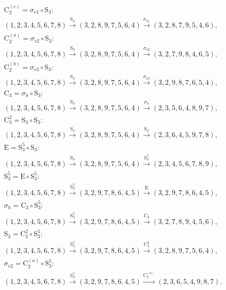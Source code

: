\begin{align*}
& \mathrm{C}_{2}^{(c)} = \sigma_{v1} \circ \mathrm{S}_{3}:\; \\& (1,2,3,4,5,6,7,8) \xrightarrow{\mathrm{S}_{3}} (3,2,8,9,7,5,6,4) \xrightarrow{\sigma_{v1}} (3,2,8,7,9,5,4,6), \\
& \mathrm{C}_{2}^{(a)} = \sigma_{v2} \circ \mathrm{S}_{3}:\; \\& (1,2,3,4,5,6,7,8) \xrightarrow{\mathrm{S}_{3}} (3,2,8,9,7,5,6,4) \xrightarrow{\sigma_{v2}} (3,2,7,9,8,4,6,5), \\
& \mathrm{C}_{2}^{(b)} = \sigma_{v3} \circ \mathrm{S}_{3}:\; \\& (1,2,3,4,5,6,7,8) \xrightarrow{\mathrm{S}_{3}} (3,2,8,9,7,5,6,4) \xrightarrow{\sigma_{v3}} (3,2,9,8,7,6,5,4), \\
& \mathrm{C}_{3} = \sigma_{h} \circ \mathrm{S}_{3}:\; \\& (1,2,3,4,5,6,7,8) \xrightarrow{\mathrm{S}_{3}} (3,2,8,9,7,5,6,4) \xrightarrow{\sigma_{h}} (2,3,5,6,4,8,9,7), \\
& \mathrm{C}_{3}^{2} = \mathrm{S}_{3} \circ \mathrm{S}_{3}:\; \\& (1,2,3,4,5,6,7,8) \xrightarrow{\mathrm{S}_{3}} (3,2,8,9,7,5,6,4) \xrightarrow{\mathrm{S}_{3}} (2,3,6,4,5,9,7,8), \\
& \mathrm{E} = \mathrm{S}_{3}^{5} \circ \mathrm{S}_{3}:\; \\& (1,2,3,4,5,6,7,8) \xrightarrow{\mathrm{S}_{3}} (3,2,8,9,7,5,6,4) \xrightarrow{\mathrm{S}_{3}^{5}} (2,3,4,5,6,7,8,9), \\
& \mathrm{S}_{3}^{5} = \mathrm{E} \circ \mathrm{S}_{3}^{5}:\; \\& (1,2,3,4,5,6,7,8) \xrightarrow{\mathrm{S}_{3}^{5}} (3,2,9,7,8,6,4,5) \xrightarrow{\mathrm{E}} (3,2,9,7,8,6,4,5), \\
& \sigma_{h} = \mathrm{C}_{3} \circ \mathrm{S}_{3}^{5}:\; \\& (1,2,3,4,5,6,7,8) \xrightarrow{\mathrm{S}_{3}^{5}} (3,2,9,7,8,6,4,5) \xrightarrow{\mathrm{C}_{3}} (3,2,7,8,9,4,5,6), \\
& \mathrm{S}_{3} = \mathrm{C}_{3}^{2} \circ \mathrm{S}_{3}^{5}:\; \\& (1,2,3,4,5,6,7,8) \xrightarrow{\mathrm{S}_{3}^{5}} (3,2,9,7,8,6,4,5) \xrightarrow{\mathrm{C}_{3}^{2}} (3,2,8,9,7,5,6,4), \\
& \sigma_{v2} = \mathrm{C}_{2}^{(a)} \circ \mathrm{S}_{3}^{5}:\; \\& (1,2,3,4,5,6,7,8) \xrightarrow{\mathrm{S}_{3}^{5}} (3,2,9,7,8,6,4,5) \xrightarrow{\mathrm{C}_{2}^{(a)}} (2,3,6,5,4,9,8,7), \\

\end{align*}

